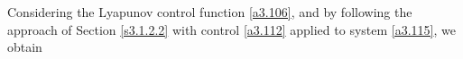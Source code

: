 \documentclass[10pt, a4paper]{amsart}
\makeatletter
\theoremstyle{plain}
\theoremstyle{definition}
\theoremstyle{remark}
\renewenvironment{proof}[1][\proofname]{\par
  \pushQED{\qed}%
  \normalfont \topsep6\p@\@plus6\p@\relax
  \trivlist
  \item[\hskip\labelsep
        \itshape
    #1\ \ref{#1}.]\ignorespaces
}{%
  \popQED\endtrivlist\@endpefalse
}
\numberwithin{equation}{section}
\makeatother
\begin{document}
\begin{proof}[of Proposition \ref{proposition3.18}]
Considering the Lyapunov control function \eqref{a3.106}, and by following the approach of Section \ref{s3.1.2.2} with control \eqref{a3.112} applied to system \eqref{a3.115}, we obtain 






\end{proof}
\end{document}
